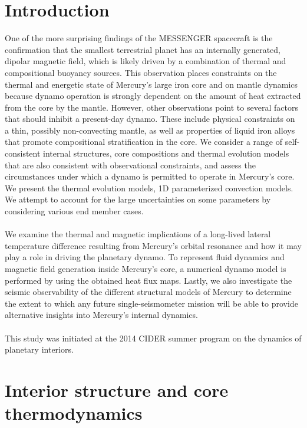\documentclass[landscape,a0b,final]{a0poster}
\begin{document}
\begin{multicols}{3}

\section*{Introduction}

One of the more surprising findings of the MESSENGER spacecraft is the confirmation that the smallest terrestrial planet has an internally generated, dipolar magnetic field, which is likely driven by a combination of thermal and compositional buoyancy sources. 
This observation places constraints on the thermal and energetic state of Mercury’s large iron core and on mantle dynamics because dynamo operation is strongly dependent on the amount of heat extracted from the core by the mantle.
However, other observations point to several factors that should inhibit a present-day dynamo. 
These include physical constraints on a thin, possibly non-convecting mantle, as well as properties of liquid iron alloys that promote compositional stratification in the core.
We consider a range of self-consistent internal structures, core compositions and thermal evolution models that are also consistent with observational constraints, and assess the circumstances under which a dynamo is permitted to operate in Mercury’s core. 
We present the thermal evolution models, 1D parameterized convection models. 
We attempt to account for the large uncertainties on some parameters by considering various end member cases.
\\
\\
We examine the thermal and magnetic implications of a long-lived lateral temperature difference resulting from Mercury’s orbital resonance and how it may play a role in driving the planetary dynamo. 
To represent fluid dynamics and magnetic field generation inside Mercury’s core, a numerical dynamo model is performed by using the obtained heat flux maps.
Lastly, we also investigate the seismic observability of the different structural models of Mercury to determine the extent to which any future single-seismometer mission will be able to provide alternative insights into Mercury's internal dynamics.
\\
\\
This study was initiated at the 2014 CIDER summer program on the dynamics of planetary interiors.


\section*{Interior structure and core thermodynamics}


\end{multicols}
\end{document}
